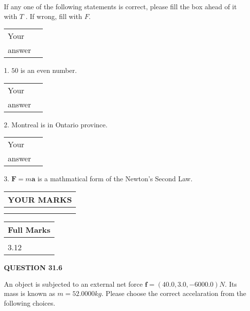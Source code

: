 \documentclass[12pt]{article}
\begin{document}
  
If any one of the following statements is correct, please fill the box ahead of it with $T$ .
If wrong, fill with $F$.
 
\noindent\begin{tabular}{|l|l|}\hline Your&\hspace{.2in} \\ answer&\hspace{.2in} \\ \hline \end{tabular}
1. $ %
50$ is an  %
even number.
 
\noindent\begin{tabular}{|l|l|}\hline Your&\hspace{.2in} \\ answer&\hspace{.2in} \\ \hline \end{tabular}
2.  %
Montreal is in  %
Ontario province.
 
\noindent\begin{tabular}{|l|l|}\hline Your&\hspace{.2in} \\ answer&\hspace{.2in} \\ \hline \end{tabular}
3.  %
$\mathbf{F}=m\mathbf{a}$ is a mathmatical form of
the Newton's Second Law.
 

 
\vspace{0.3in}
  
\vspace{0.2in}
  
\noindent\begin{tabular}{|l|}
\hline
 YOUR MARKS  \\
\hline
 \\ 
 \\ 
\hline
\end{tabular}
\hspace{0.05in} \begin{tabular}{|l|}
\hline
 Full Marks  \\
\hline
 \\ 
3.12 \\
\hline
\end{tabular}
{\textbf{\Large{QUESTION
31.6 
}}}
  
  
 
 
An object is subjected to an external net force $\mathbf{f}=
(40.0 , 3.0 , -6000.0) N$.
Its mass is known as $m= %
52.0000 kg$. Please choose the
correct accelaration from the following choices.
 
\end{document}
